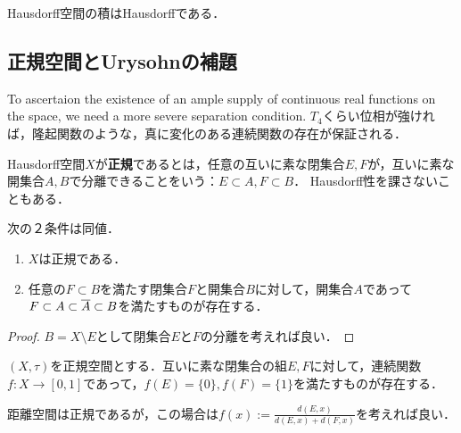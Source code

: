 \documentclass[uplatex,dvipdfmx]{jsreport}
\begin{document}
\begin{corollary}\label{cor-product-of-Hausdorff-spaces}
    Hausdorff空間の積はHausdorffである．
\end{corollary}

\subsection{正規空間とUrysohnの補題}

\begin{tcolorbox}[colframe=ForestGreen, colback=ForestGreen!10!white,breakable,colbacktitle=ForestGreen!40!white,coltitle=black,fonttitle=\bfseries\sffamily,
title=]
    To ascertaion the existence of an ample supply of continuous real functions on the space, we need a more severe separation condition.
    $T_4$くらい位相が強ければ，隆起関数のような，真に変化のある連続関数の存在が保証される．
\end{tcolorbox}

\begin{definition}[normal]
    Hausdorff空間$X$が\textbf{正規}であるとは，任意の互いに素な閉集合$E,F$が，互いに素な開集合$A,B$で分離できることをいう：$E\subset A,F\subset B$．
    Hausdorff性を課さないこともある．
\end{definition}

\begin{proposition}
    次の２条件は同値．
    \begin{enumerate}
        \item $X$は正規である．
        \item 任意の$F\subset B$を満たす閉集合$F$と開集合$B$に対して，開集合$A$であって$F\subset A\subset\overline{A}\subset B$を満たすものが存在する．
    \end{enumerate}
\end{proposition}
\begin{proof}
    $B=X\setminus E$として閉集合$E$と$F$の分離を考えれば良い．
\end{proof}

\begin{theorem}
    $(X,\tau)$を正規空間とする．互いに素な閉集合の組$E,F$に対して，連続関数$f:X\to [0,1]$であって，$f(E)=\{0\},f(F)=\{1\}$を満たすものが存在する．
\end{theorem}
\begin{remarks}
    距離空間は正規であるが，この場合は$f(x):=\frac{d(E,x)}{d(E,x)+d(F,x)}$を考えれば良い．
\end{remarks}
\end{document}
